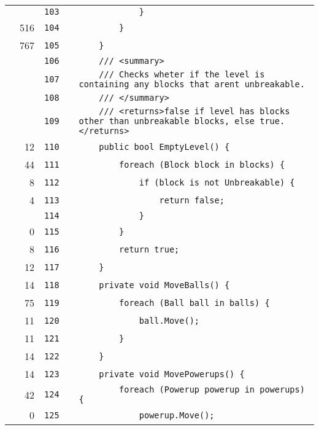 \documentclass[a4paper,landscape,10pt]{article}
\begin{document}
\begin{longtable}[l]{lrrll}
\cellcolor{gray} &  & \verb~103~ & & \verb~            }~\\
\cellcolor{green} & 516 & \verb~104~ & & \verb~        }~\\
\cellcolor{green} & 767 & \verb~105~ & & \verb~    }~\\
\cellcolor{gray} &  & \verb~106~ & & \verb~    /// <summary>~\\
\cellcolor{gray} &  & \verb~107~ & & \verb~    /// Checks wheter if the level is containing any blocks that arent unbreakable.~\\
\cellcolor{gray} &  & \verb~108~ & & \verb~    /// </summary>~\\
\cellcolor{gray} &  & \verb~109~ & & \verb~    /// <returns>false if level has blocks other than unbreakable blocks, else true.</returns>~\\
\cellcolor{green} & 12 & \verb~110~ & & \verb~    public bool EmptyLevel() {~\\
\cellcolor{green} & 44 & \verb~111~ & & \verb~        foreach (Block block in blocks) {~\\
\cellcolor{orange} & 8 & \verb~112~ & & \verb~            if (block is not Unbreakable) {~\\
\cellcolor{green} & 4 & \verb~113~ & & \verb~                return false;~\\
\cellcolor{gray} &  & \verb~114~ & & \verb~            }~\\
\cellcolor{red} & 0 & \verb~115~ & & \verb~        }~\\
\cellcolor{green} & 8 & \verb~116~ & & \verb~        return true;~\\
\cellcolor{green} & 12 & \verb~117~ & & \verb~    }~\\
\cellcolor{green} & 14 & \verb~118~ & & \verb~    private void MoveBalls() {~\\
\cellcolor{green} & 75 & \verb~119~ & & \verb~        foreach (Ball ball in balls) {~\\
\cellcolor{green} & 11 & \verb~120~ & & \verb~            ball.Move();~\\
\cellcolor{green} & 11 & \verb~121~ & & \verb~        }~\\
\cellcolor{green} & 14 & \verb~122~ & & \verb~    }~\\
\cellcolor{green} & 14 & \verb~123~ & & \verb~    private void MovePowerups() {~\\
\cellcolor{orange} & 42 & \verb~124~ & & \verb~        foreach (Powerup powerup in powerups) {~\\
\cellcolor{red} & 0 & \verb~125~ & & \verb~            powerup.Move();~\\

\end{longtable}
\end{document}
